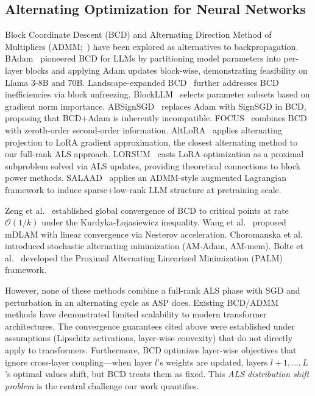 \documentclass[11pt]{article}
\begin{document}
\subsection{Alternating Optimization for Neural Networks}

Block Coordinate Descent (BCD) and Alternating Direction Method of Multipliers (ADMM;~\cite{boyd2011distributed}) have been explored as alternatives to backpropagation. BAdam~\cite{luo2024badam} pioneered BCD for LLMs by partitioning model parameters into per-layer blocks and applying Adam updates block-wise, demonstrating feasibility on Llama 3-8B and 70B. Landscape-expanded BCD~\cite{luo2025accelerating} further addresses BCD inefficiencies via block unfreezing. BlockLLM~\cite{blockllm2025} selects parameter subsets based on gradient norm importance. ABSignSGD~\cite{absignsgd2026} replaces Adam with SignSGD in BCD, proposing that BCD+Adam is inherently incompatible. FOCUS~\cite{focus2025} combines BCD with zeroth-order second-order information. AltLoRA~\cite{almansoori2025altlora} applies alternating projection to LoRA gradient approximation, the closest alternating method to our full-rank ALS approach. LORSUM~\cite{almansoori2026lorsum} casts LoRA optimization as a proximal subproblem solved via ALS updates, providing theoretical connections to block power methods. SALAAD~\cite{ma2026salaad} applies an ADMM-style augmented Lagrangian framework to induce sparse+low-rank LLM structure at pretraining scale.

Zeng et al.~\cite{zeng2019global} established global convergence of BCD to critical points at rate $\mathcal{O}(1/k)$ under the Kurdyka-Łojasiewicz inequality. Wang et al.~\cite{wang2018accelerated} proposed mDLAM with linear convergence via Nesterov acceleration. Choromanska et al.~\cite{choromanska2019beyond} introduced stochastic alternating minimization (AM-Adam, AM-mem). Bolte et al.~\cite{bolte2014proximal} developed the Proximal Alternating Linearized Minimization (PALM) framework.

However, none of these methods combine a full-rank ALS phase with SGD and perturbation in an alternating cycle as ASP does. Existing BCD/ADMM methods have demonstrated limited scalability to modern transformer architectures. The convergence guarantees cited above were established under assumptions (Lipschitz activations, layer-wise convexity) that do not directly apply to transformers. Furthermore, BCD optimizes layer-wise objectives that ignore cross-layer coupling---when layer $l$'s weights are updated, layers $l+1, \ldots, L$'s optimal values shift, but BCD treats them as fixed. This \textit{ALS distribution shift problem} is the central challenge our work quantifies.
\end{document}
